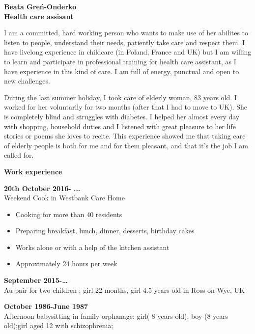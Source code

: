 \documentclass[a4paper,12pt,final]{memoir}
\newcommand{\SmallSep}{\vspace{0.5em}}
\newenvironment{Career Profile}
	{\ignorespaces\textbf{\color{ForestGreen} Career Profile}}
	{\Sep\ignorespacesafterend}
\newenvironment{Key experience}
	{\ignorespaces\textbf{\color{ForestGreen} Key experience}}
	{\Sep\ignorespacesafterend}
\newcommand{\CVSection}[1]
	{\Large\textbf{#1}\par
	\SmallSep\normalsize\normalfont}
\newcommand{\CVItem}[1]
	{\textbf{\color{ForestGreen} #1}}
\begin{document}
\Huge\bfseries {\color{ForestGreen} Beata Greń-Onderko} \\
\Large\bfseries  Health care assisant \\

\normalsize\normalfont

\begin{Career Profile} 
I am a committed, hard working person who wants to make use of her abilites to listen to people, understand their needs, patiently take care and respect them. 
I have livelong experience in childcare (in Poland, France and UK) but I am willing to learn and participate in professional training for health care assistant, as I have experience in this kind of care.
I am full of energy, punctual and open to new challenges.
\end{Career Profile}

\begin{Key experience}
During the last summer holiday, I took care of elderly woman, 83 years old. I worked for her voluntarily for two months (after that I had to move to UK). She is completely blind and struggles with diabetes. I helped her almost every day with shopping, household duties and  I listened with great pleasure to her life stories or poems she loves to recite. This experience showed me that taking care of elderly people is both for me and for them pleasant, and that it's the job I am called for. 
\end{Key experience}

\CVSection{Work experience}

\CVItem{20th October 2016- ...}\\
Weekend Cook in Westbank Care Home \\
\begin{itemize}
\item{Cooking for more than 40 residents}
\item{Preparing breakfast, lunch, dinner, desserts, birthday cakes}
\item{Works alone or with a help of the kitchen assistant}
\item{Approximately 24 hours per week}
\end{itemize}
\CVItem{September 2015-…}\\
Au pair for two children : girl 22 months, girl 4.5 years old in Ross-on-Wye, UK
\SmallSep

\CVItem{October 1986-June 1987}\\
Afternoon babysitting in family orphanage: girl( 8 years old); boy (8 years old);girl aged 12 with schizophrenia;
\SmallSep
\end{document}
